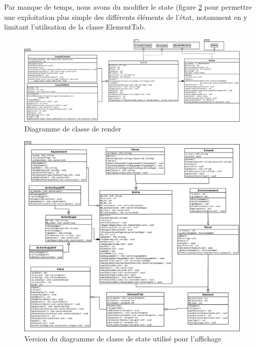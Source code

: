 \documentclass[a4paper,12pt]{article}
\begin{document}
Par manque de temps, nous avons du modifier le state (figure \ref{fig:newState} pour permettre une exploitation plus simple des différents éléments de l'état, notamment en y limitant l'utilisation de la classe ElementTab.

\begin{figure}[hbt!]
    \centering
    \includegraphics[width =.8\paperwidth, angle=0]{images/render.png}
    \caption{Diagramme de classe de render}
    \label{fig:render}
\end{figure}

\begin{figure}[hbt!]
    \centering
    \includegraphics[width =.8\paperwidth, angle=0]{images/state.png}
    \caption{Version du diagramme de classe de state utilisé pour l'affichage}
    \label{fig:newState}
\end{figure}



\end{document}

